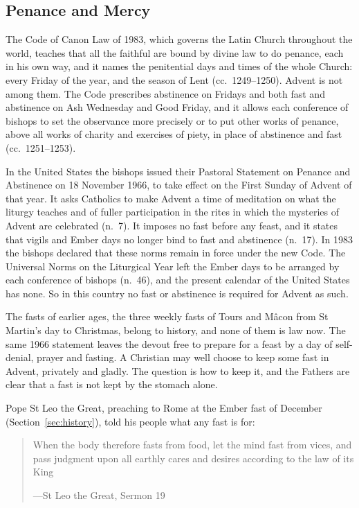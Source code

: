 \subsection{Penance and Mercy}\label{sec:penance}

The Code of Canon Law of 1983, which governs the
Latin Church throughout the world, teaches that all the faithful are bound by
divine law to do penance, each in his own way, and it names the penitential
days and times of the whole Church: every Friday of the year, and the season of
Lent (cc.~1249--1250). Advent is not among them. The Code prescribes
abstinence on Fridays and both fast and abstinence on Ash Wednesday and Good
Friday, and it allows each conference of bishops to set the observance more
precisely or to put other works of penance, above all works of charity and
exercises of piety, in place of abstinence and fast (cc.~1251--1253).

In the United States the bishops issued their Pastoral Statement on Penance and
Abstinence on 18 November 1966, to take effect on the First Sunday of Advent of
that year. It asks Catholics to make Advent a time of meditation on what the
liturgy teaches and of fuller participation in the rites in which the mysteries
of Advent are celebrated (n.~7). It imposes no fast before any feast, and it
states that vigils and Ember days no longer bind to fast and abstinence
(n.~17). In 1983 the bishops declared that these norms remain in force under
the new Code. The Universal Norms on the Liturgical Year left the Ember days to
be arranged by each conference of bishops (n.~46), and the present calendar of
the United States has none. So in this country no fast or abstinence is
required for Advent as such.

The fasts of earlier ages, the three weekly fasts of Tours and Mâcon from St
Martin's day to Christmas, belong to history, and none of them is law now. The
same 1966 statement leaves the devout free to prepare for a feast by a day of self-denial, prayer and fasting. A Christian may well choose
to keep some fast in Advent, privately and gladly. The question is how to keep
it, and the Fathers are clear that a fast is not kept by the stomach alone.

Pope St Leo the Great, preaching to Rome at the Ember fast of December
(Section~\ref{sec:history}), told his people what any fast is for:

\begin{quote}
When the body therefore fasts from food, let the mind fast from vices, and pass
judgment upon all earthly cares and desires according to the law of its King\par
{\smallskip\noindent\small ---St Leo the Great, Sermon 19\par}
\end{quote}

